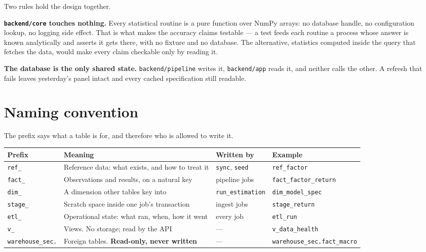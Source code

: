 \documentclass[11pt,a4paper]{article}
\newcommand{\code}[1]{\texttt{\small #1}}
\begin{document}
Two rules hold the design together.

\textbf{\code{backend/core} touches nothing.} Every statistical routine is a pure
function over NumPy arrays: no database handle, no configuration lookup, no logging
side effect. That is what makes the accuracy claims testable --- a test feeds each
routine a process whose answer is known analytically and asserts it gets there,
with no fixture and no database. The alternative, statistics computed inside the
query that fetches the data, would make every claim checkable only by reading it.

\textbf{The database is the only shared state.} \code{backend/pipeline} writes it,
\code{backend/app} reads it, and neither calls the other. A refresh that fails
leaves yesterday's panel intact and every cached specification still readable.

\section{Naming convention}

The prefix says what a table is for, and therefore who is allowed to write it.

\begin{table}[htbp]
\centering\small
\begin{tabularx}{\textwidth}{@{}lXll@{}}
\toprule
\textbf{Prefix} & \textbf{Meaning} & \textbf{Written by} & \textbf{Example} \\
\midrule
\code{ref\_} & Reference data: what exists, and how to treat it & \code{sync}, \code{seed} & \code{ref\_factor} \\
\code{fact\_} & Observations and results, on a natural key & pipeline jobs & \code{fact\_factor\_return} \\
\code{dim\_} & A dimension other tables key into & \code{run\_estimation} & \code{dim\_model\_spec} \\
\code{stage\_} & Scratch space inside one job's transaction & ingest jobs & \code{stage\_return} \\
\code{etl\_} & Operational state: what ran, when, how it went & every job & \code{etl\_run} \\
\code{v\_} & Views. No storage; read by the API & --- & \code{v\_data\_health} \\
\code{warehouse\_sec.} & Foreign tables. \textbf{Read-only, never written} & --- & \code{warehouse\_sec.fact\_macro} \\
\bottomrule
\end{tabularx}
\end{table}
\end{document}
